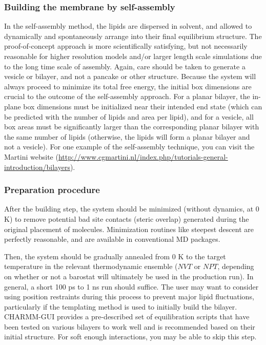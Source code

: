 \documentclass[9pt,bestpractices]{livecoms}
\begin{document}
\subsubsection{Building the membrane by self-assembly}
\label{subsubsec:selfassembly}
In the self-assembly method, the lipids are dispersed in solvent, and allowed to dynamically and spontaneously arrange into their final equilibrium structure.
The proof-of-concept approach is more scientifically satisfying, but not necessarily reasonable for higher resolution models and/or larger length scale simulations due to the long time scale of assembly.
Again, care should be taken to generate a vesicle or bilayer, and not a pancake or other structure.
Because the system will always proceed to minimize its total free energy, the initial box dimensions are crucial to the outcome of the self-assembly approach.
For a planar bilayer, the in-plane box dimensions must be initialized near their intended end state (which can be predicted with the number of lipids and area per lipid), and for a vesicle, all box areas must be significantly larger than the corresponding planar bilayer with the same number of lipids (otherwise, the lipids will form a planar bilayer and not a vesicle).
For one example of the self-assembly technique, you can visit the Martini website (\url{http://www.cgmartini.nl/index.php/tutorials-general-introduction/bilayers}).

\subsubsection{Preparation procedure}
\label{subsubsec:prepproc}
After the building step, the system should be minimized (without dynamics, at 0 K) to remove potential bad site contacts (steric overlap) generated during the original placement of molecules.
Minimization routines like steepest descent are perfectly reasonable, and are available in conventional MD packages.

Then, the system should be gradually annealed from 0 K to the target temperature in the relevant thermodynamic ensemble ($NVT$ or $NPT$, depending on whether or not a barostat will ultimately be used in the production run).
In general, a short 100 ps to 1 ns run should suffice.
The user may want to consider using position restraints during this process to prevent major lipid fluctuations, particularly if the templating method is used to initially build the bilayer. CHARMM-GUI provides a pre-described set of equilibration scripts that have been tested on various bilayers to work well and is recommended based on their initial structure.
For soft enough interactions, you may be able to skip this step.
\end{document}
